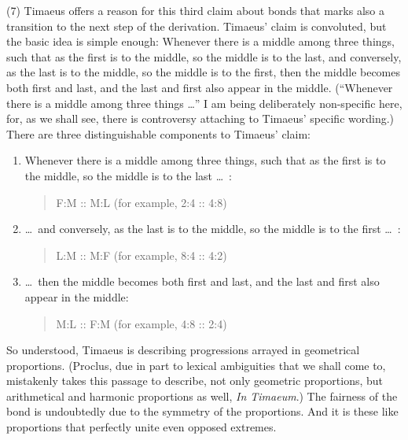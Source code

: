 (7) Timaeus offers a reason for this third claim about bonds that marks also a transition to the next step of the derivation. Timaeus' claim is convoluted, but the basic idea is simple enough: Whenever there is a middle among three things, such that as the first is to the middle, so the middle is to the last, and conversely, as the last is to the middle, so the middle is to the first, then the middle becomes both first and last, and the last and first also appear in the middle. (``Whenever there is a middle among three things \ldots'' I am being deliberately non-specific here, for, as we shall see, there is controversy attaching to Timaeus' specific wording.) There are three distinguishable components to Timaeus' claim:
\begin{enumerate}[(1)]
	\item Whenever there is a middle among three things, such that as the first is to the middle, so the middle is to the last \ldots\ :
	\begin{quote}
		F:M :: M:L (for example, 2:4 :: 4:8)
	\end{quote}
	\item \ldots\ and conversely, as the last is to the middle, so the middle is to the first \dots\ :
	\begin{quote}
		L:M :: M:F (for example, 8:4 :: 4:2)
	\end{quote}
	\item \ldots\ then the middle becomes both first and last, and the last and first also appear in the middle:
	\begin{quote}
		M:L :: F:M (for example, 4:8 :: 2:4)
	\end{quote}
\end{enumerate}
So understood, Timaeus is describing progressions arrayed in geometrical proportions. (Proclus, due in part to lexical ambiguities that we shall come to, mistakenly takes this passage to describe, not only geometric proportions, but arithmetical and harmonic proportions as well, \emph{In Timaeum}.) The fairness of the bond is undoubtedly due to the symmetry of the proportions. And it is these like proportions that perfectly unite even opposed extremes.  


